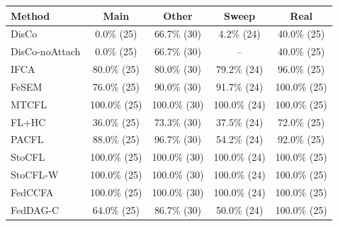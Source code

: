 {\scriptsize
\begin{tabular}{l c c c c}
\toprule
Method & Main & Other & Sweep & Real \\
\midrule
DisCo & 0.0\% (25) & 66.7\% (30) & 4.2\% (24) & 40.0\% (25) \\
DisCo-noAttach & 0.0\% (25) & 66.7\% (30) & -- & 40.0\% (25) \\
IFCA & 80.0\% (25) & 80.0\% (30) & 79.2\% (24) & 96.0\% (25) \\
FeSEM & 76.0\% (25) & 90.0\% (30) & 91.7\% (24) & 100.0\% (25) \\
MTCFL & 100.0\% (25) & 100.0\% (30) & 100.0\% (24) & 100.0\% (25) \\
FL+HC & 36.0\% (25) & 73.3\% (30) & 37.5\% (24) & 72.0\% (25) \\
PACFL & 88.0\% (25) & 96.7\% (30) & 54.2\% (24) & 92.0\% (25) \\
StoCFL & 100.0\% (25) & 100.0\% (30) & 100.0\% (24) & 100.0\% (25) \\
StoCFL-W & 100.0\% (25) & 100.0\% (30) & 100.0\% (24) & 100.0\% (25) \\
FedCCFA & 100.0\% (25) & 100.0\% (30) & 100.0\% (24) & 100.0\% (25) \\
FedDAG-C & 64.0\% (25) & 86.7\% (30) & 50.0\% (24) & 100.0\% (25) \\
\bottomrule
\end{tabular}
}
